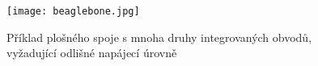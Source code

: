 {    \begin{figure}[ht!]
      \centering
      \texttt{[image: beaglebone.jpg]}
      \caption{Příklad plošného spoje s mnoha druhy integrovaných obvodů, vyžadující odlišné 
               napájecí úrovně}
      \label{SPICE:Basso_intro}
    \end{figure}

} %
\printbibliography[title={Seznam literatury}, heading=subbibliography]
